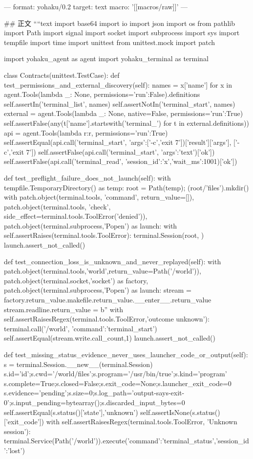 ---
format: yohaku/0.2
target: text
macro: '[[macros/raw]]'
---

## 正文
````text
import base64
import io
import json
import os
from pathlib import Path
import signal
import socket
import subprocess
import sys
import tempfile
import time
import unittest
from unittest.mock import patch

import yohaku_agent as agent
import yohaku_terminal as terminal


class Contracts(unittest.TestCase):
    def test_permissions_and_external_discovery(self):
        names = {x['name'] for x in agent.Tools(lambda _: None, permissions={'run':False}).definitions}
        self.assertIn('terminal_list', names)
        self.assertNotIn('terminal_start', names)
        external = agent.Tools(lambda _: None, native=False, permissions={'run':True})
        self.assertFalse(any(t['name'].startswith('terminal_') for t in external.definitions))
        api = agent.Tools(lambda r:r, permissions={'run':True})
        self.assertEqual(api.call('terminal_start', {'args':['-c','exit 7']})['result']['args'], ['-c','exit 7'])
        self.assertFalse(api.call('terminal_start', {'args':'text'})['ok'])
        self.assertFalse(api.call('terminal_read', {'session_id':'x','wait_ms':1001})['ok'])

    def test_preflight_failure_does_not_launch(self):
        with tempfile.TemporaryDirectory() as temp:
            root = Path(temp); (root/'files').mkdir()
            with patch.object(terminal.tools, 'command', return_value=[]), patch.object(terminal.tools, 'check', side_effect=terminal.tools.ToolError('denied')), patch.object(terminal.subprocess,'Popen') as launch:
                with self.assertRaises(terminal.tools.ToolError): terminal.Session(root, {})
                launch.assert_not_called()

    def test_connection_loss_is_unknown_and_never_replayed(self):
        with patch.object(terminal.tools,'world',return_value=Path('/world')), patch.object(terminal.socket,'socket') as factory, patch.object(terminal.subprocess,'Popen') as launch:
            stream = factory.return_value.makefile.return_value.__enter__.return_value
            stream.readline.return_value = b''
            with self.assertRaisesRegex(terminal.tools.ToolError,'outcome unknown'):
                terminal.call('/world', {'command':'terminal_start'})
            self.assertEqual(stream.write.call_count,1)
            launch.assert_not_called()

    def test_missing_status_evidence_never_uses_launcher_code_or_output(self):
        s = terminal.Session.__new__(terminal.Session)
        s.id='id';s.cwd='/world/files';s.program='/usr/bin/true';s.kind='program'
        s.complete=True;s.closed=False;s.exit_code=None;s.launcher_exit_code=0
        s.evidence='pending';s.size=0;s.log_path='output-says-exit-0';s.input_pending=bytearray();s.discarded_input_bytes=0
        self.assertEqual(s.status()['state'],'unknown')
        self.assertIsNone(s.status()['exit_code'])
        with self.assertRaisesRegex(terminal.tools.ToolError, 'Unknown session'):
            terminal.Service(Path('/world')).execute({'command':'terminal_status','session_id':'lost'})


